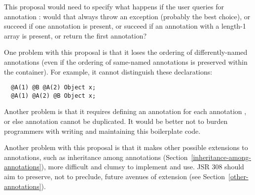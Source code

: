 \documentclass[10pt]{article}
\begin{document}
This proposal would need to specify what happens if the user queries for
annotation :  would that always throw an exception (probably the
best choice), or succeed if one  annotation is present, or succeed
if an  annotation with a length-1 array is present, or
return the first  annotation?

One problem with this proposal is that it loses the ordering of
differently-named annotations (even if the ordering of same-named
annotations is preserved within the container).  For example, it cannot
distinguish these
declarations:
\begin{Verbatim}
  @A(1) @B @A(2) Object x;
  @A(1) @A(2) @B Object x;
\end{Verbatim}

Another problem is that it requires defining an 
annotation for each annotation , or else annotation 
cannot be duplicated.  It would be better not to burden programmers with
writing and maintaining this boilerplate code.

Another problem with this proposal is that it makes other possible
extensions to annotations, such as inheritance among annotations
(Section~\ref{inheritance-among-annotations}), more difficult and clumsy to
implement and use.  JSR 308 should aim to preserve, not to preclude, future
avenues of extension (see Section~\ref{other-annotations}).


% 
% 
% 
% 
% 
% 
% 
% 
% 
% 
% 
% 
% 
% 
\end{document}
